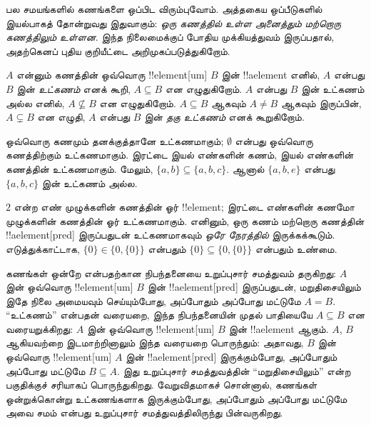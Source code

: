 \documentclass[../../../include/open-logic-section]{subfiles}
\begin{document}

\begin{explain}
பல சமயங்களில் கணங்களை ஒப்பிட விரும்புவோம்.
அத்தகைய ஒப்பீடுகளில் இயல்பாகத் தோன்றுவது இதுவாகும்:
\emph{ஒரு கணத்தில் உள்ள அனைத்தும் மற்றொரு கணத்திலும் உள்ளன}.
இந்த நிலைமைக்குப் போதிய முக்கியத்துவம் இருப்பதால்,
அதற்கெனப் புதிய குறியீட்டை அறிமுகப்படுத்துகிறோம்.
\end{explain}

\begin{defn}[உட்கணம்]
$A$ என்னும் கணத்தின் ஒவ்வொரு !!{element}[um] $B$ இன்
!!a{element} எனில், $A$ என்பது $B$ இன் \emph{உட்கணம்} எனக் கூறி,
$A \subseteq B$ என எழுதுகிறோம். $A$ என்பது $B$ இன் உட்கணம் அல்ல எனில்,
$A \not\subseteq B$ என எழுதுகிறோம்.
$A \subseteq B$ ஆகவும் $A \neq B$ ஆகவும் இருப்பின்,
$A \subsetneq B$ என எழுதி, $A$ என்பது $B$ இன் \emph{தகு உட்கணம்}
எனக் கூறுகிறோம்.
\end{defn}

\begin{ex}
ஒவ்வொரு கணமும் தனக்குத்தானே உட்கணமாகும்; $\emptyset$ என்பது
ஒவ்வொரு கணத்திற்கும் உட்கணமாகும். இரட்டை இயல் எண்களின் கணம்,
இயல் எண்களின் கணத்தின் உட்கணமாகும். மேலும்,
$\{ a, b \} \subseteq \{ a, b, c \}$.
ஆனால் $\{ a, b, e \}$ என்பது $\{ a, b, c \}$ இன் உட்கணம் அல்ல.
\end{ex}

\begin{ex}
$2$ என்ற எண் முழுக்களின் கணத்தின் ஓர் !!{element};
இரட்டை எண்களின் கணமோ முழுக்களின் கணத்தின் ஓர் உட்கணமாகும்.
எனினும், ஒரு கணம் மற்றொரு கணத்தின் !!a{element}[pred] இருப்பதுடன் உட்கணமாகவும்
\emph{ஒரே நேரத்தில்} இருக்கக்கூடும். எடுத்துக்காட்டாக,
$\{0\} \in \{0, \{0\}\}$ என்பதும்
$\{0\} \subseteq \{0, \{0\}\}$ என்பதும் உண்மை.
\end{ex}

கணங்கள் ஒன்றே என்பதற்கான நிபந்தனையை உறுப்புசார் சமத்துவம் தருகிறது:
$A$ இன் ஒவ்வொரு !!{element}[um] $B$ இன் !!a{element}[pred] இருப்பதுடன்,
மறுதிசையிலும் இதே நிலை அமையவும் செய்யும்போது,
அப்போதும் அப்போது மட்டுமே $A = B$.
``உட்கணம்'' என்பதன் வரையறை, இந்த நிபந்தனையின் முதல் பாதியையே
$A \subseteq B$ என வரையறுக்கிறது: $A$ இன் ஒவ்வொரு !!{element}[um]
$B$ இன் !!a{element} ஆகும்.
$A$, $B$ ஆகியவற்றை இடமாற்றினாலும் இந்த வரையறை பொருந்தும்:
அதாவது, $B$ இன் ஒவ்வொரு !!{element}[um] $A$ இன் !!a{element}[pred]
இருக்கும்போது, அப்போதும் அப்போது மட்டுமே $B \subseteq A$.
இது உறுப்புசார் சமத்துவத்தின் ``மறுதிசையிலும்'' என்ற பகுதிக்குச்
சரியாகப் பொருந்துகிறது. வேறுவிதமாகச் சொன்னால், கணங்கள் ஒன்றுக்கொன்று
உட்கணங்களாக இருக்கும்போது, அப்போதும் அப்போது மட்டுமே அவை சமம்
என்பது உறுப்புசார் சமத்துவத்திலிருந்து பின்வருகிறது.
\end{document}
